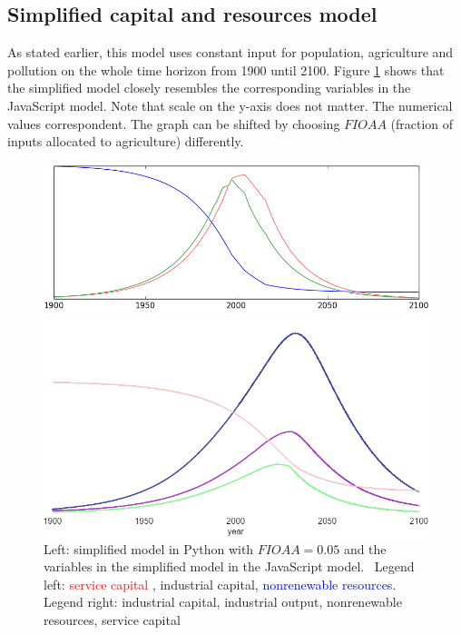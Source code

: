 \documentclass[10pt,a4paper]{scrartcl}
\begin{document}
\subsection*{Simplified capital and resources model}

As stated earlier, this model uses constant input for population, agriculture and pollution on the whole time horizon from 1900 until 2100. Figure \ref{simplified-model} shows that the simplified model closely resembles the corresponding variables in the JavaScript model. Note that scale on the y-axis does not matter. The numerical values correspondent. The graph can be shifted by choosing $FIOAA$ (fraction of inputs allocated to agriculture) differently.

\begin{figure}
\centering
\begin{minipage}{0.49\textwidth}
\includegraphics[width=\textwidth]{./plaatjes/simplified-python.png}
\end{minipage}
\begin{minipage}{0.49\textwidth}
\includegraphics[width=\textwidth]{./plaatjes/simplified-javascript.png}
\end{minipage}
\caption{Left: simplified model in Python with $FIOAA = 0.05$ and the variables in the simplified model in the JavaScript model. \
Legend left: \textcolor{red}{service capital} , \textcolor[HTML]{0b850b}{industrial capital}, \textcolor{blue}{nonrenewable resources}. Legend right: \textcolor[HTML]{41439a}{industrial capital}, \textcolor[HTML]{84F78F}{industrial output}, \textcolor[HTML]{F4C9CF}{nonrenewable resources}, \textcolor[HTML]{a43bc1}{service capital}}
\label{simplified-model}
\end{figure}
\end{document}
